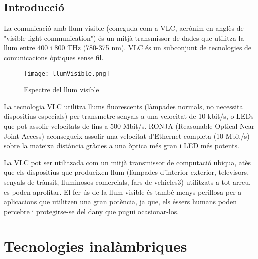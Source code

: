 
\subsection*{Introducció}
La comunicació amb llum visible (coneguda com a VLC, acrònim en anglès de "visible light communication") és un mitjà transmissor de dades que utilitza la llum entre 400 i 800 THz (780-375 nm). VLC és un subconjunt de tecnologies de comunicacions òptiques sense fil.



\begin{figure}[h!]
    \centering
    \texttt{[image: llumVisible.png]}
    \caption{Espectre del llum visible}
\end{figure}


La tecnologia  VLC utilitza llums fluorescents (làmpades normals, no necessita dispositius especials) per transmetre senyals a una velocitat de 10 kbit/s, o LEDs que pot assolir velocitats de fins a 500 Mbit/s. RONJA (Reasonable Optical Near Joint Access) aconsegueix assolir una velocitat d'Ethernet completa (10 Mbit/s) sobre la mateixa distància gràcies a una òptica més gran i LED més potents.

La VLC pot ser utilitzada com un mitjà transmissor de computació ubiqua, atès que els dispositius que produeixen llum (làmpades d'interior exterior, televisors, senyals de trànsit, lluminosos comercials, fars de vehicles3) utilitzats a tot arreu, es poden aprofitar. El fer ús de la llum visible és també menys perillosa per a aplicacions que utilitzen una gran potència, ja que, els éssers humans poden percebre i protegirse-se del dany que pugui ocasionar-los.



\section*{Tecnologies inalàmbriques}

